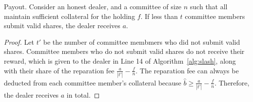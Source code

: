\begin{theorem}{Payout.}
    Consider an honest dealer, and a committee of size $n$ such that all maintain sufficient collateral for the holding $f$.
    If less than $t$ committee members submit valid shares, the dealer receives $a$.
\end{theorem}
\begin{proof}
    Let $t'$ be the number of committee membmers who did not submit valid shares.
    Committee members who do not submit valid shares do not receive their reward, which is given to the dealer in Line 14 of Algorithm~\ref{alg:slash}, along with their share of the reparation fee $\frac{a}{|t'|} - \frac{f}{n}$.
    The reparation fee can always be deducted from each committee member's collateral because $\hat{b} \geq \frac{a}{|t'|} - \frac{f}{n}$.
    Therefore, the dealer receives $a$ in total.
\end{proof}